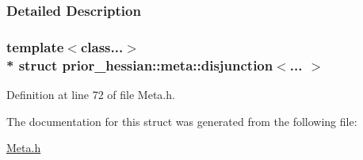 \subsubsection{Detailed Description}
\subsubsection*{template$<$class...$>$\\*
struct prior\+\_\+hessian\+::meta\+::disjunction$<$... $>$}



Definition at line 72 of file Meta.\+h.



The documentation for this struct was generated from the following file\+:\begin{DoxyCompactItemize}
\item 
\hyperlink{Meta_8h}{Meta.\+h}\end{DoxyCompactItemize}
